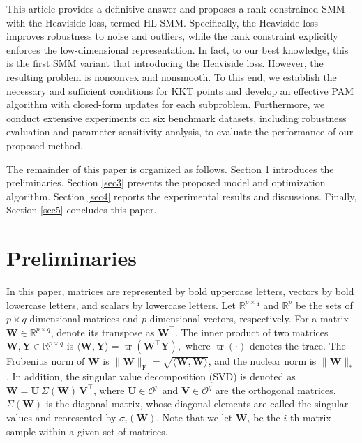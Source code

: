 \documentclass[sn-mathphys]{JORSC-jnl}%
\theoremstyle{thmstyleone}%
\theoremstyle{thmstylethree}%
\theoremstyle{thmstyleone} %
\begin{document}
This article provides a definitive answer and proposes a rank-constrained SMM with the Heaviside loss, termed HL-SMM. 
Specifically, the Heaviside loss improves robustness to noise and outliers, while the rank constraint explicitly enforces the low-dimensional representation. 
In fact, to our best knowledge, this is the first SMM variant that introducing the Heaviside loss. 
However, the resulting problem is nonconvex and nonsmooth. 
To this end, we establish the necessary and sufficient conditions for KKT points and develop an effective PAM algorithm with closed-form updates for each subproblem. 
Furthermore, we conduct extensive experiments on six benchmark datasets, including robustness evaluation and parameter sensitivity analysis, to evaluate the performance of our proposed method.


The remainder of this paper is organized as follows.
Section \ref{sec2} introduces the preliminaries.
Section \ref{sec3} presents the proposed model and optimization algorithm.
Section \ref{sec4} reports the experimental results and discussions.
Finally, Section \ref{sec5} concludes this paper.





\section{Preliminaries}\label{sec2}


In this paper, matrices are represented by bold uppercase letters, vectors by bold lowercase letters, and scalars by lowercase letters. Let $\mathbb{R}^{p \times q}$ and $\mathbb{R}^p$ be the sets of $p \times q$-dimensional matrices and $p$-dimensional vectors, respectively. 
For a matrix $\mathbf{W}\in\mathbb{R}^{p\times q}$, denote its transpose as $\mathbf{W}^\top$.
The inner product of two matrices $\mathbf{W},\mathbf{Y}\in\mathbb{R}^{p\times q}$ is
$\langle\mathbf{W},\mathbf{Y}\rangle = \operatorname{tr}(\mathbf{W}^\top\mathbf{Y}),$
where $\operatorname{tr}(\cdot)$ denotes the trace.
The Frobenius norm of $\mathbf{W}$ is $\|\mathbf{W}\|_{\mathrm{F}} = \sqrt{\langle\mathbf{W},\mathbf{W}\rangle}$, and the nuclear norm is $\|\mathbf{W}\|_*$. 
In addition, the singular value decomposition (SVD) is denoted as $
\mathbf{W}=\mathbf{U}\,\Sigma(\mathbf{W})\,\mathbf{V}^\top$,
where $\mathbf{U}\in\mathcal{O}^p$ and $\mathbf{V}\in\mathcal{O}^q$ are the orthogonal matrices, $\Sigma(\mathbf{W})$ is the diagonal matrix, whose diagonal elements are
called the singular values and reoresented by $\sigma_i(\mathbf{W})$.
Note that we let $\mathbf{W}_i$ be the $i$‑th matrix sample within a given set of matrices.
\end{document}
